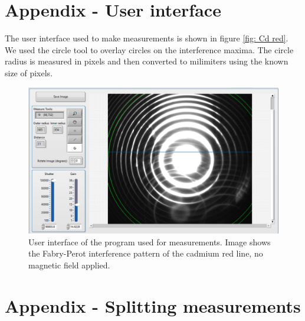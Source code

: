 \documentclass[11pt]{article}
\begin{document}
\section{Appendix - User interface}
The user interface used to make measurements is shown in figure \ref{fig: Cd red}. We used the circle tool to overlay circles on the interference maxima. The circle radius is measured in pixels and then converted to milimiters using the known size of pixels. 

\begin{figure}[h!]
    \centering
    \includegraphics[width=0.65\linewidth]{d measurement.png}
    \captionsetup{justification=centering}
    \caption{User interface of the program used for measurements. Image shows the Fabry-Perot interference pattern of the cadmium red line, no magnetic field applied.}
    \label{fig: d measurement}
\end{figure}

\newpage

\section{Appendix - Splitting measurements}
\end{document}
